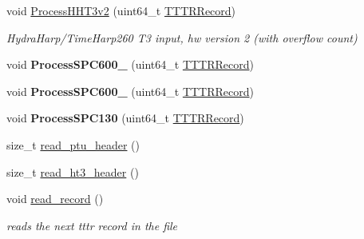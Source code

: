 \begin{DoxyCompactItemize}
void \hyperlink{class_p_q_a9296d47519a9a58945acb1cb78d63f4d}{Process\+H\+H\+T3v2} (uint64\+\_\+t \hyperlink{class_t_t_t_r_aeca22c4f524dbb501b7545d397e8f782}{T\+T\+T\+R\+Record})
\begin{DoxyCompactList}\small\item\em Hydra\+Harp/\+Time\+Harp260 T3 input, hw version 2 (with overflow count) \end{DoxyCompactList}\item 
\mbox{\label{class_p_q_a1e9a5e9fe62db361928b10153f60285a}} 
void {\bfseries Process\+S\+P\+C600\+\_} (uint64\+\_\+t \hyperlink{class_t_t_t_r_aeca22c4f524dbb501b7545d397e8f782}{T\+T\+T\+R\+Record})
\item 
\mbox{\label{class_p_q_acadb3d0fa68a8f3a2f4c8dcbb2b482b2}} 
void {\bfseries Process\+S\+P\+C600\+\_} (uint64\+\_\+t \hyperlink{class_t_t_t_r_aeca22c4f524dbb501b7545d397e8f782}{T\+T\+T\+R\+Record})
\item 
\mbox{\label{class_p_q_a9b0b58c1e70138091e858e7f3830d8de}} 
void {\bfseries Process\+S\+P\+C130} (uint64\+\_\+t \hyperlink{class_t_t_t_r_aeca22c4f524dbb501b7545d397e8f782}{T\+T\+T\+R\+Record})
\item 
size\+\_\+t \hyperlink{class_p_q_a044423a28b6d028170504788cdb9b672}{read\+\_\+ptu\+\_\+header} ()
\item 
size\+\_\+t \hyperlink{class_p_q_a50f84ba3ab4e1707367cde3c10476c3f}{read\+\_\+ht3\+\_\+header} ()
\item 
\mbox{\label{class_p_q_a1b68ab0c519d6e6349e3d18600cd4f11}} 
void \hyperlink{class_p_q_a1b68ab0c519d6e6349e3d18600cd4f11}{read\+\_\+record} ()
\begin{DoxyCompactList}\small\item\em reads the next tttr record in the file \end{DoxyCompactList}\end{DoxyCompactItemize}
